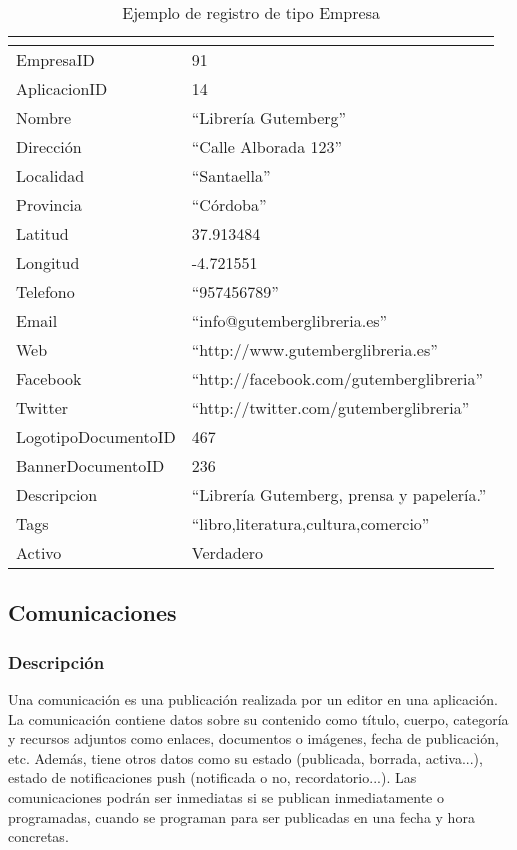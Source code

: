 \begin{table}[h]
    \centering
    \begin{tabular}{|ll|}
        \hline
        \rowcolor[HTML]{9B9B9B} 
        \multicolumn{1}{|c}{\cellcolor[HTML]{9B9B9B}{\color[HTML]{FFFFFF} Atributo}} &
        \multicolumn{1}{c|}{\cellcolor[HTML]{9B9B9B}{\color[HTML]{FFFFFF} Valor}} \\
        \hline
        EmpresaID & 91 \\
        AplicacionID & 14 \\
        Nombre & ``Librería Gutemberg'' \\
        Dirección & ``Calle Alborada 123'' \\
        Localidad & ``Santaella'' \\
        Provincia & ``Córdoba'' \\
        Latitud & 37.913484 \\
        Longitud & -4.721551 \\
        Telefono & ``957456789'' \\
        Email & ``info@gutemberglibreria.es'' \\
        Web & ``http://www.gutemberglibreria.es'' \\
        Facebook & ``http://facebook.com/gutemberglibreria'' \\
        Twitter & ``http://twitter.com/gutemberglibreria'' \\
        LogotipoDocumentoID & 467 \\
        BannerDocumentoID & 236 \\
        Descripcion & ``Librería Gutemberg, prensa y papelería.'' \\
        Tags & ``libro,literatura,cultura,comercio'' \\
        Activo & Verdadero \\
        \hline
    \end{tabular}%
    \caption{Ejemplo de registro de tipo Empresa}
    \label{cuadro:ejemplo-empresa}
\end{table}

\subsection{Comunicaciones}

\subsubsection*{Descripción}
Una comunicación es una publicación realizada por un editor en una aplicación. La comunicación contiene datos sobre su contenido como título, cuerpo, categoría y recursos adjuntos como enlaces, documentos o imágenes, fecha de publicación, etc. Además, tiene otros datos como su estado (publicada, borrada, activa...), estado de notificaciones push (notificada o no, recordatorio...). Las comunicaciones podrán ser inmediatas si se publican inmediatamente o programadas, cuando se programan para ser publicadas en una fecha y hora concretas.

